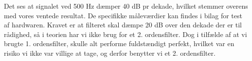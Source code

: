 Det ses at signalet ved 500 Hz dæmper 40 dB pr dekade, hvilket stemmer overens med vores ventede resultat. De specifikke måleværdier kan findes i bilag for test af hardwaren.
Kravet er at filteret skal dæmpe 20 dB over den dekade der er til rådighed, så i teorien har vi ikke brug for et 2. ordensfilter. Dog i tilfælde af at vi brugte 1. ordensfilter, skulle alt performe fuldstændigt perfekt, hvilket var en risiko vi ikke var villige at tage, og derfor benytter vi et 2. ordensfilter.

\clearpage